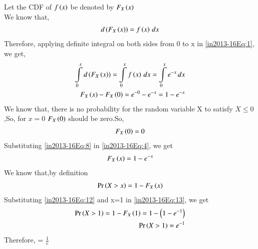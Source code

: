

Let the CDF of $f\left(x\right)$ be denoted by $F_X\left(x\right)$ \\
We know that,
\begin{align}
d\brak{F_X\brak{x}} = f\brak{x} \,dx \label{in2013-16Eq:1}
\end{align}
Therefore, applying definite integral on both sides from 0 to x in \eqref{in2013-16Eq:1}, we get,
\begin{align}
\int\limits_{0}^{x} d\brak{F_X\brak{x}} = \int\limits_{0}^{x} f\brak{x} \,dx = \int\limits_{0}^{x} e^{-x} \,dx \notag \\
F_X\brak{x} - F_X\brak{0} = e^{-0} - e^{-x} = 1 - e^{-x}   \label{in2013-16Eq:4}
\end{align}
We know that, there is no probability for the random variable X to satisfy $X \leq 0$,So, for $x = 0$ $F_X\left(0\right)$ should be zero.So,
\begin{align}
F_X\brak{0} = 0 \label{in2013-16Eq:8}
\end{align}
Substituting \eqref{in2013-16Eq:8} in \eqref{in2013-16Eq:4}, we get
\begin{align}
F_X\brak{x} = 1 - e^{-x} \label{in2013-16Eq:12}
\end{align}
We know that,by definition 
\begin{align}
\pr{X > x} = 1-F_X\brak{x} \label{in2013-16Eq:13}
\end{align}
Substituting \eqref{in2013-16Eq:12} and x=1 in \eqref{in2013-16Eq:13}, we get
\begin{align}
\Pr\left(X>1\right)=1-F_X\left(1\right)=1-\left(1-e^{-1}\right) \\
\Pr\left(X>1\right)=e^{-1}
\end{align}
Therefore,  = $\frac{1}{e}$